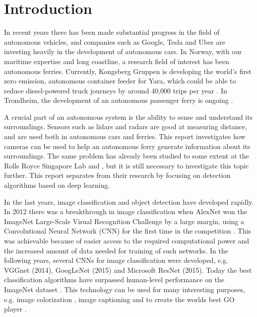 
\chapter{Introduction}

In recent years there has been made substantial progress in the field of autonomous vehicles, and companies such as Google, Tesla and Uber are investing heavily in the development of autonomous cars. In Norway, with our maritime expertise and long coastline, a research field of interest has been autonomous ferries. Currently, Kongsberg Gruppen is developing the world's first zero emission, autonomous container feeder for Yara, which could be able to reduce diesel-powered truck journeys by around 40,000 trips per year \citep{yara}. In Trondheim, the development of an autonomous passenger ferry is ongoing \citep{autonom_trd}. 

\vspace{3mm}

\noindent
A crucial part of an autonomous system is the ability to sense and understand its surroundings. Sensors such as lidars and radars are good at measuring distance, and are used both in autonomous cars and ferries. This report investigates how cameras can be used to help an autonomous ferry generate information about its surroundings. The same problem has already been studied to some extent at the Rolls Royce Singapore Lab \citep{Prasad2016a} and  \citep{Prasad2016}, but it is still necessary to investigate this topic further. This report separates from their research by focusing on detection algorithms based on deep learning. 

\vspace{3mm}

\noindent
In the last years, image classification and object detection have developed rapidly. In 2012 there was a breakthrough in image classification when AlexNet won the ImageNet Large-Scale Visual Recognition Challenge by a large margin, using a Convolutional Neural Network (CNN) for the first time in the competition \citep{Krizhevsky2012}. This was achievable because of easier access to the required computational power and the increased amount of data needed for training of such networks. In the following years, several CNNs for image classification were developed, e.g. VGGnet (2014), GoogLeNet (2015) and Microsoft ResNet (2015). Today the best classification algorithms have surpassed human-level performance on the ImageNet dataset \citep{He}. This technology can be used for many interesting purposes, e.g. image colorization \citep{Zhang2016}, image captioning \citep{Karpathy2016} and to create the worlds best GO player \citep{Silver2016}.

